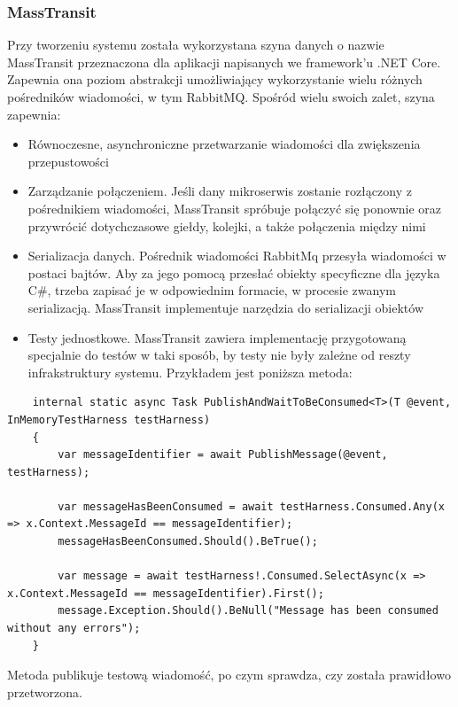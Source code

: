 \documentclass[11pt, a4]{article} %
\begin{document}
\subsubsection{MassTransit}

Przy tworzeniu systemu została wykorzystana szyna danych o nazwie MassTransit 
przeznaczona dla aplikacji napisanych we framework'u .NET Core. Zapewnia ona poziom 
abstrakcji umożliwiający wykorzystanie wielu różnych pośredników wiadomości, w 
tym RabbitMQ. Spośród wielu swoich zalet, szyna zapewnia:

\begin{itemize} %
    \item Równoczesne, asynchroniczne przetwarzanie wiadomości dla zwiększenia 
    przepustowości
    \item Zarządzanie połączeniem. Jeśli dany mikroserwis zostanie rozłączony 
    z pośrednikiem wiadomości, MassTransit spróbuje połączyć się ponownie oraz 
    przywrócić dotychczasowe giełdy, kolejki, a także połączenia między nimi
    \item Serializacja danych. Pośrednik wiadomości RabbitMq przesyła wiadomości 
    w postaci bajtów. Aby za jego pomocą przesłać obiekty specyficzne dla języka 
    C\#, trzeba zapisać je w odpowiednim formacie, w procesie zwanym serializacją. 
    MassTransit implementuje narzędzia do serializacji obiektów
    \item Testy jednostkowe. MassTransit zawiera implementację przygotowaną specjalnie 
    do testów w taki sposób, by testy nie były zależne od reszty infrakstruktury 
    systemu. Przykładem jest poniższa metoda:
\end{itemize}

\begin{lstlisting}
    internal static async Task PublishAndWaitToBeConsumed<T>(T @event, InMemoryTestHarness testHarness)
    {
        var messageIdentifier = await PublishMessage(@event, testHarness);

        var messageHasBeenConsumed = await testHarness.Consumed.Any(x => x.Context.MessageId == messageIdentifier);
        messageHasBeenConsumed.Should().BeTrue();

        var message = await testHarness!.Consumed.SelectAsync(x => x.Context.MessageId == messageIdentifier).First();
        message.Exception.Should().BeNull("Message has been consumed without any errors");
    }
    \end{lstlisting}

Metoda publikuje testową wiadomość, po czym sprawdza, czy została prawidłowo 
przetworzona. 
\end{document}
